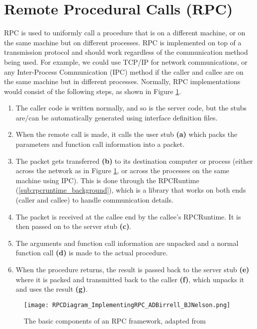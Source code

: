 \section{Remote Procedural Calls (RPC)} %
\label{sec:rpc_background}

RPC is used to uniformly call a procedure that is on a different machine, or on the same machine but on different processes. RPC is implemented on top of a transmission protocol and should work regardless of the communication method being used. For example, we could use TCP/IP for network communications, or any Inter-Process Communication (IPC) method if the caller and callee are on the same machine but in different processes. Normally, RPC implementations would consist of the following steps, as shown in Figure \ref{fig:rpc-components}.

\begin{enumerate}
  \item The caller code is written normally, and so is the server code, but the stubs are/can be automatically generated using interface definition files.
  \item When the remote call is made, it calls the user stub \textbf{(a)} which packs the parameters and function call information into a packet.
  \item The packet gets transferred \textbf{(b)} to its destination computer or process (either across the network as in Figure \ref{fig:rpc-components}, or across the processes on the same machine using IPC). This is done through the RPCRuntime (\ref{sub:rpcruntime_background}), which is a library that works on both ends (caller and callee) to handle communication details.
  \item The packet is received at the callee end by the callee's RPCRuntime. It is then passed on to the server stub \textbf{(c)}.
  \item The arguments and function call information are unpacked and a normal function call \textbf{(d)} is made to the actual procedure.
  \item When the procedure returns, the result is passed back to the server stub \textbf{(e)} where it is packed and transmitted back to the caller \textbf{(f)}, which unpacks it and uses the result \textbf{(g)}.
\end{enumerate}

\begin{figure}
    \centering
    \texttt{[image: RPCDiagram\_ImplementingRPC\_ADBirrell\_BJNelson.png]} 
    \caption{The basic components of an RPC framework, adapted from \cite{birrell1984implementing}}
    \label{fig:rpc-components}
\end{figure}

